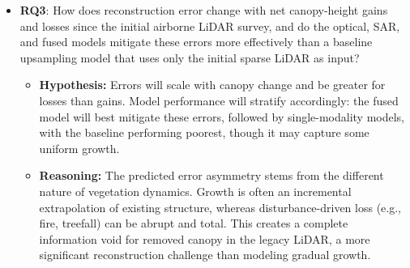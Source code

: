 \documentclass[preprints,article,accept,pdftex,moreauthors]{Definitions/mdpi}
\begin{document}
\begin{itemize}
  \item \textbf{RQ3}: How does reconstruction error change with net canopy-height gains and losses since the initial airborne LiDAR survey, and do the optical, SAR, and fused models mitigate these errors more effectively than a baseline upsampling model that uses only the initial sparse LiDAR as input?
        \begin{itemize}
            \item \textbf{Hypothesis:} Errors will scale with canopy change and be greater for losses than gains. Model performance will stratify accordingly: the fused model will best mitigate these errors, followed by single-modality models, with the baseline performing poorest, though it may capture some uniform growth.
            \item \textbf{Reasoning:} The predicted error asymmetry stems from the different nature of vegetation dynamics. Growth is often an incremental extrapolation of existing structure, whereas disturbance-driven loss (e.g., fire, treefall) can be abrupt and total. This creates a complete information void for removed canopy in the legacy LiDAR, a more significant reconstruction challenge than modeling gradual growth.
        \end{itemize}
\end{itemize} 
\end{document}
